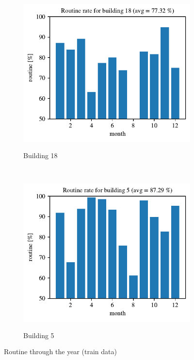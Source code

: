 \begin{figure}[H]
    \begin{subfigure}{.5\textwidth}
		\caption{Building 18}
		\includegraphics[width=1\linewidth]{../Figures/EC/b18year.pdf}
		\label{fig:ec_b18year}
	\end{subfigure}%
    ~ 
    \begin{subfigure}{.5\textwidth}
		\caption{Building 5}
		\includegraphics[width=1\linewidth]{../Figures/EC/b5year.pdf}
		\label{fig:ec_b5year}
	\end{subfigure}%
	
	\caption{Routine through the year (train data)}
    \label{fig:ec_year}
\end{figure}

